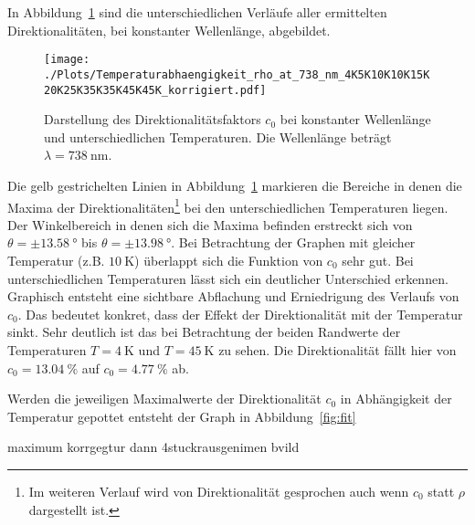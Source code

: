 In Abbildung~\ref{fig:temp_all_nach} sind die unterschiedlichen Verläufe
aller ermittelten Direktionalitäten, bei konstanter Wellenlänge, abgebildet.
\begin{figure}
    \centering
    \texttt{[image: ./Plots/Temperaturabhaengigkeit\_rho\_at\_738\_nm\_4K5K10K10K15K20K25K35K35K45K45K\_korrigiert.pdf]}
    \caption{Darstellung des Direktionalitätsfaktors $c_0$ bei konstanter Wellenlänge und  unterschiedlichen Temperaturen.
    Die Wellenlänge beträgt $\lambda =\SI{738}{\nano\meter}$.}
    \label{fig:temp_all_nach}
\end{figure}
\FloatBarrier

Die gelb gestrichelten Linien in Abbildung~\ref{fig:temp_all_nach} markieren die Bereiche 
in denen die Maxima der Direktionalitäten\footnote{Im weiteren Verlauf wird
von Direktionalität gesprochen auch wenn $c_0$ statt $\rho$ dargestellt ist.} 
bei den unterschiedlichen Temperaturen liegen.
Der Winkelbereich in denen sich die Maxima befinden erstreckt sich von  $\theta = \pm \SI{13,58}{\degree} 
$ bis $ \theta = \pm \SI{13,98}{\degree}$.
Bei Betrachtung der Graphen mit gleicher Temperatur (z.B. $\SI{10}{\kelvin}$) 
überlappt sich die Funktion von $c_0$ sehr gut.
Bei unterschiedlichen Temperaturen lässt sich ein deutlicher Unterschied erkennen.
Graphisch entsteht eine sichtbare Abflachung und Erniedrigung des Verlaufs von $c_0$.
Das bedeutet konkret, dass der Effekt der Direktionalität mit der Temperatur sinkt.
Sehr deutlich ist das bei Betrachtung der beiden Randwerte 
der Temperaturen $T = \SI{4}{\kelvin}$ und $ T = \SI{45}{\kelvin}$ zu sehen.
Die Direktionalität fällt hier von $c_0= \SI{13.04}{\percent}$ auf $c_0 = \SI{4,77}{\percent}$ ab.

Werden die jeweiligen Maximalwerte der Direktionalität $c_0$ in Abhängigkeit
der Temperatur gepottet entsteht der Graph in Abbildung~\ref{fig:fit}


maximum korrgegtur
dann 4stuckrausgenimen bvild 